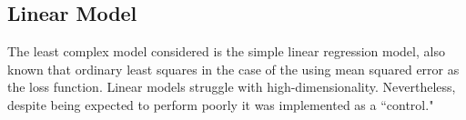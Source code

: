 \documentclass[a4paper, table]{article}
\begin{document}

%
%
%

\subsection{Linear Model}

The least complex model considered is the simple linear regression model, also known that ordinary least squares in the case of the using mean squared error as the loss function. Linear models struggle with high-dimensionality. Nevertheless, despite being expected to perform poorly it was implemented as a ``control."
\end{document}
